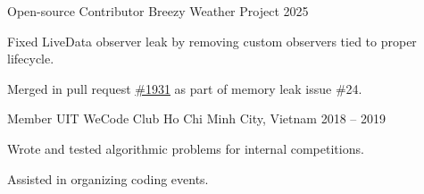 \begin{cventries}

    \cventry
    {Open-source Contributor}
    {Breezy Weather Project}
    {}{2025}
    {
        \begin{cvitems}
            \item {Fixed LiveData observer leak by removing custom observers tied to proper lifecycle.}
            \item {Merged in pull request \href{https://github.com/breezy-weather/breezy-weather/pull/1931}{\#1931} as part of memory leak issue \#24.}
        \end{cvitems}
    }

    \cventry
    {Member}
    {UIT WeCode Club}
    {Ho Chi Minh City, Vietnam}
    {2018 -- 2019}
    {
        \begin{cvitems}
            \item {Wrote and tested algorithmic problems for internal competitions.}
            \item {Assisted in organizing coding events.}
        \end{cvitems}
    }
\end{cventries}
